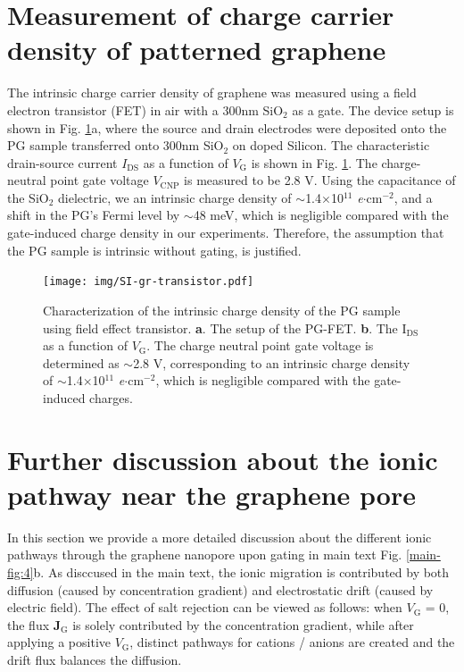 \documentclass[manuscript=suppinfo,email=true, hyperref=true, keywords=false]{achemso}
\newcommand{\Fig}{Fig.}
\begin{document}
\section{Measurement of charge carrier density of patterned graphene}
\label{sec:charge-dens}
The intrinsic charge carrier density of graphene was measured using a
field electron transistor (FET) in air with a 300nm SiO$_2$ as a
gate. The device setup is shown in \Fig{} \ref{fig:charge-dens}a,
where the source and drain electrodes were deposited onto the PG
sample transferred onto 300nm SiO$_2$ on doped Silicon. The
characteristic drain-source current $I_{\mathrm{DS}}$ as a function of
$V_{\mathrm{G}}$ is shown in \Fig{} \ref{fig:charge-dens}. The
charge-neutral point gate voltage $V_{\mathrm{CNP}}$ is measured to be 2.8 V.
Using the capacitance of the SiO$_{2}$ dielectric, we an intrinsic
charge density of $\sim{}$1.4$\times$10$^{11}$
\textit{e}$\cdot$cm$^{-2}$, and a shift in the PG's Fermi level by
$\sim{}$48 meV, which is negligible compared with the gate-induced
charge density in our experiments. Therefore, the assumption that the
PG sample is intrinsic without gating, is justified.

\begin{figure}[htbp]
  \centering
  \texttt{[image: img/SI-gr-transistor.pdf]}
  \caption{Characterization of the intrinsic charge density of the PG
    sample using field effect transistor. \textbf{a}. The setup of the
    PG-FET. \textbf{b}. The I$_{\mathrm{DS}}$ as a function of
    $V_{\mathrm{G}}$. The charge neutral point gate voltage is
    determined as $\sim{}$2.8 V, corresponding to an intrinsic charge
    density of $\sim{}$1.4$\times$10$^{11}$
    \textit{e}$\cdot$cm$^{-2}$, which is negligible compared with the
    gate-induced charges.}
  \label{fig:charge-dens}
\end{figure}

\section{Further discussion about the ionic pathway near the graphene pore}
\label{sec:conc}

In this section we provide a more detailed discussion about the
different ionic pathways through the graphene nanopore upon gating in
main text \Fig{} \ref{main-fig:4}b. As disccused in the main text, the
ionic migration is contributed by both diffusion (caused by
concentration gradient) and electrostatic drift (caused by electric
field).  The effect of salt rejection can be viewed as follows: when
$V_{\mathrm{G}}$ = 0, the flux $\boldsymbol{J}_{\mathrm{G}}$ is solely
contributed by the concentration gradient, while after applying a
positive $V_{\mathrm{G}}$, distinct pathways for cations /
anions are created and the drift flux balances the diffusion.
\end{document}
